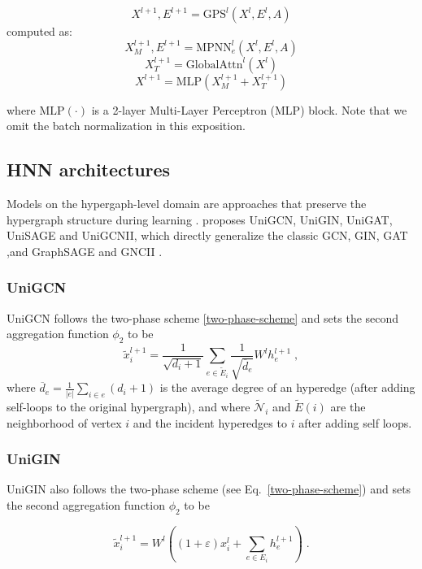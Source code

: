 $$X^{l+1},E^{l+1}=\text{GPS}^l(X^l, E^l, A)$$
computed as:
$$X^{l+1}_M,E^{l+1}=\text{MPNN}^l_e(X^l, E^l, A)$$
$$X^{l+1}_T=\text{GlobalAttn}^l(X^l)$$
$$X^{l+1}=\text{MLP}(X_M^{l+1}+X_T^{l+1})$$

where $\text{MLP}(\cdot)$ is a 2-layer Multi-Layer Perceptron (MLP) block. Note that we omit the batch normalization in this exposition.


\subsection{HNN architectures}\label{hnn-architectures}
Models on the hypergaph-level domain are approaches that preserve the hypergraph structure during learning \citep{kim2024survey}.
\citet{huang2021unignn} proposes UniGCN, UniGIN, UniGAT, UniSAGE and UniGCNII, which directly generalize the classic  GCN, GIN, GAT \citep{velivckovic2017graph},and GraphSAGE \citep{hamilton2017inductive} and GNCII \citep{chen2020simple}.\\

\subsubsection{UniGCN}
UniGCN follows the two-phase scheme \ref{two-phase-scheme} and sets the second aggregation function $\phi_2$ to be
\begin{equation}
\tilde{x}_i^{l+1} = \frac{1}{\sqrt{d_i+1}} \sum_{e \in \tilde{E}_i} \frac{1}{\sqrt{\overline{d}_e}} W^l h_e^{l+1} \; ,
\end{equation}
where $\overline{d}_e=\frac{1}{|e|}\sum_{i\in e} (d_i+1)$ is the average degree of an hyperedge (after adding self-loops to the original hypergraph), and where $\tilde{\mathcal{N}}_i$ and $\tilde{E}(i)$ are the neighborhood of vertex $i$ and the incident hyperedges to $i$ after adding self loops. \\ 


\subsubsection{UniGIN}

UniGIN also follows the two-phase scheme (see Eq.~\ref{two-phase-scheme}) and sets the second aggregation function $\phi_2$ to be

\begin{equation} 
\tilde{x}_i^{l+1} = W^l\left( (1 + \varepsilon)x_i^l + \sum_{e \in E_i} h_e^{l+1} \right) \; .
\end{equation} 

